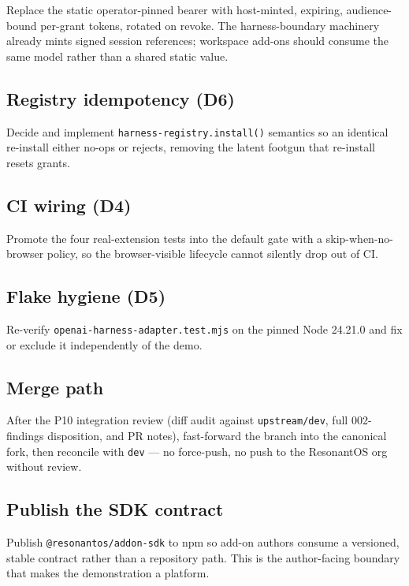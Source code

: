 \documentclass[11pt]{article}
\begin{document}
Replace the static operator-pinned bearer with host-minted, expiring,
audience-bound per-grant tokens, rotated on revoke. The harness-boundary
machinery already mints signed session references; workspace add-ons should
consume the same model rather than a shared static value.

\subsection{Registry idempotency (D6)}

Decide and implement \texttt{harness-registry.install()} semantics so an
identical re-install either no-ops or rejects, removing the latent footgun that
re-install resets grants.

\subsection{CI wiring (D4)}

Promote the four real-extension tests into the default gate with a
skip-when-no-browser policy, so the browser-visible lifecycle cannot silently
drop out of CI.

\subsection{Flake hygiene (D5)}

Re-verify \texttt{openai-harness-adapter.test.mjs} on the pinned Node 24.21.0
and fix or exclude it independently of the demo.

\subsection{Merge path}

After the P10 integration review (diff audit against \texttt{upstream/dev},
full 002-findings disposition, and PR notes), fast-forward the branch into the
canonical fork, then reconcile with \texttt{dev} --- no force-push, no push to
the ResonantOS org without review.

\subsection{Publish the SDK contract}

Publish \texttt{@resonantos/addon-sdk} to npm so add-on authors consume a
versioned, stable contract rather than a repository path. This is the
author-facing boundary that makes the demonstration a platform.
\end{document}
